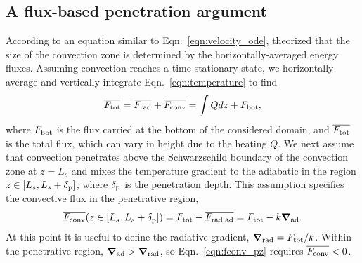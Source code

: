 \documentclass{aastex631}
\newcommand{\delp}{\ensuremath{\delta_{\rm{p}}}}
\newcommand{\Fbot}{\ensuremath{F_{\rm{bot}}}}
\newcommand{\Ftot}{\ensuremath{F_{\rm{tot}}}}
\newcommand{\Frad}{\ensuremath{F_{\rm{rad}}}}
\newcommand{\Fconv}{\ensuremath{F_{\rm{conv}}}}
\renewcommand{\vec}[1]{\boldsymbol{#1}}
\newcommand{\grad}{\vec{\nabla}}
\begin{document}
\subsection{A flux-based penetration argument}
According to an equation similar to Eqn.~\ref{eqn:velocity_ode}, \citet{zahn1991} theorized that the size of the convection zone is determined by the horizontally-averaged energy fluxes.
Assuming convection reaches a time-stationary state, we horizontally-average and vertically integrate Eqn.~\ref{eqn:temperature} to find
\begin{equation}
\overline{\Ftot} = \overline{\Frad} + \overline{\Fconv} = \int Q dz + \Fbot,
\end{equation}
where $\Fbot$ is the flux carried at the bottom of the considered domain, and $\overline{\Ftot}$ is the total flux, which can vary in height due to the heating $Q$.
We next assume that convection penetrates above the Schwarzschild boundary of the convection zone at $z = L_s$ and mixes the temperature gradient to the adiabatic in the region $z \in [L_s, L_s + \delp]$, where $\delp$ is the penetration depth.
This assumption specifies the convective flux in the penetrative region,
\begin{equation}
\overline{\Fconv}(z \in [L_s, L_s + \delp]) = \Ftot - \overline{F_{\rm{rad, ad}}} = \Ftot - k \grad_{\rm{ad}}.
\label{eqn:fconv_pz}
\end{equation}
At this point it is useful to define the radiative gradient, $\grad_{\rm{rad}} = \Ftot/k$.
Within the penetrative region, $\grad_{\rm{ad}} > \grad_{\rm{rad}}$, so Eqn.~\ref{eqn:fconv_pz} requires $\overline{\Fconv} < 0$.
\end{document}
